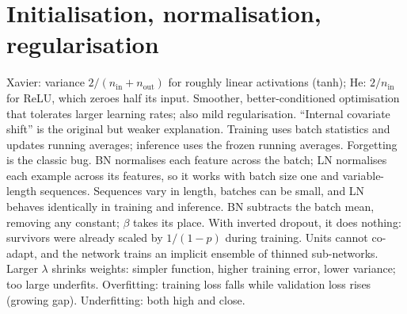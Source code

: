 \section{Initialisation, normalisation, regularisation}
\begin{rapid}
	 Xavier: variance $2/(n_\text{in}+n_\text{out})$ for roughly linear activations (tanh); He:
	$2/n_\text{in}$ for ReLU, which zeroes half its input.
	 Smoother, better-conditioned optimisation that tolerates larger learning rates; also mild
	regularisation. ``Internal covariate shift'' is the original but weaker explanation.
	 Training uses batch statistics and updates running averages; inference uses the frozen
	running averages. Forgetting  is the classic bug.
	 BN normalises each feature across the batch; LN normalises each example across its features,
	so it works with batch size one and variable-length sequences.
	 Sequences vary in length, batches can be small, and LN behaves identically in training
	and inference.
	 BN subtracts the batch mean, removing any constant; $\beta$ takes its place.
	 With inverted dropout, it does nothing: survivors were already scaled by $1/(1-p)$
	during training.
	 Units cannot co-adapt, and the network trains an implicit ensemble of thinned sub-networks.
	 Larger $\lambda$ shrinks weights: simpler function, higher training error,
	lower variance; too large underfits.
	 Overfitting: training loss falls while validation loss rises (growing gap).
	Underfitting: both high and close.
\end{rapid}

